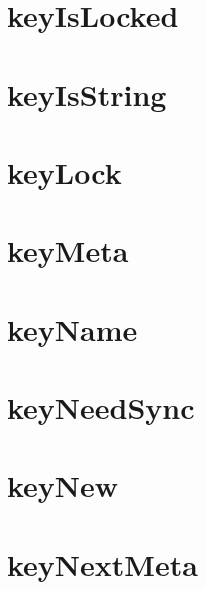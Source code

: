 \let\mypdfximage\pdfximage\def\pdfximage{\immediate\mypdfximage}\documentclass[twoside]{book}
\newcommand{\+}{\discretionary{\mbox{\scriptsize$\hookleftarrow$}}{}{}}
\begin{document}
\chapter{key\+Is\+Locked}
\label{doc_contrib_api_reviews_core_keyIsLocked_md}

\chapter{key\+Is\+String}
\label{doc_contrib_api_reviews_core_keyIsString_md}

\chapter{key\+Lock}
\label{doc_contrib_api_reviews_core_keyLock_md}

\chapter{key\+Meta}
\label{doc_contrib_api_reviews_core_keyMeta_md}

\chapter{key\+Name}
\label{doc_contrib_api_reviews_core_keyName_md}

\chapter{key\+Need\+Sync}
\label{doc_contrib_api_reviews_core_keyNeedSync_md}

\chapter{key\+New}
\label{doc_contrib_api_reviews_core_keyNew_md}

\chapter{key\+Next\+Meta}
\label{doc_contrib_api_reviews_core_keyNextMeta_md}

\end{document}
